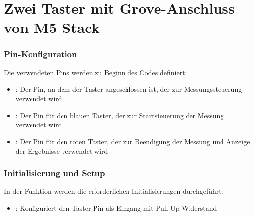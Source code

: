 %
%
%

	
\chapter{Zwei Taster mit Grove-Anschluss von M5 Stack}

\subsection{Pin-Konfiguration}

Die verwendeten Pins werden zu Beginn des Codes definiert:

\begin{itemize}
    \item {}: Der Pin, an dem der Taster angeschlossen ist, der zur Messungssteuerung verwendet wird
    \item {}: Der Pin für den blauen Taster, der zur Startsteuerung der Messung verwendet wird
    \item {}: Der Pin für den roten Taster, der zur Beendigung der Messung und Anzeige der Ergebnisse verwendet wird
\end{itemize}


\subsection{Initialisierung und Setup}
In der Funktion  werden die erforderlichen Initialisierungen durchgeführt:

\begin{itemize}
    \item {}: Konfiguriert den Taster-Pin als Eingang mit Pull-Up-Widerstand
\end{itemize} 


